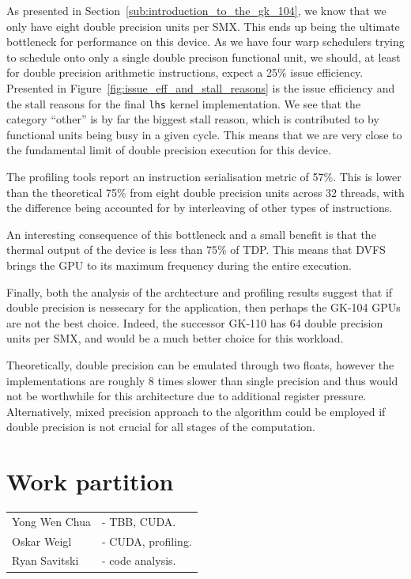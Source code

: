 \documentclass[11pt, oneside, a4paper]{article}
\begin{document}
As presented in Section~\ref{sub:introduction_to_the_gk_104}, we know that we only have eight double precision units per SMX. This ends up being the ultimate bottleneck for performance on this device.
As we have four warp schedulers trying to schedule onto only a single double precison functional unit, we should, at least for double precision arithmetic instructions, expect a 25\% issue efficiency.
Presented in Figure~\ref{fig:issue_eff_and_stall_reasons} is the issue efficiency and the stall reasons for the final \texttt{lhs} kernel implementation.
We see that the category ``other'' is by far the biggest stall reason, which is contributed to by functional units being busy in a given cycle.
This means that we are very close to the fundamental limit of double precision execution for this device.

The profiling tools report an instruction serialisation metric of 57\%. This is lower than the theoretical 75\% from eight double precision units across 32 threads, with the difference being accounted for by interleaving of other types of instructions.

An interesting consequence of this bottleneck and a small benefit is that the thermal output of the device is less than 75\% of TDP. This means that DVFS brings the GPU to its maximum frequency during the entire execution.

Finally, both the analysis of the archtecture and profiling results suggest that if double precision is nessecary for the application, then perhaps the GK-104 GPUs are not the best choice. Indeed, the successor GK-110 has 64 double precision units per SMX, and would be a much better choice for this workload.

Theoretically, double precision can be emulated through two floats, however the implementations are roughly 8 times slower than single precision and thus would not be worthwhile for this architecture due to additional register pressure. Alternatively, mixed precision approach to the algorithm could be employed if double precision is not crucial for all stages of the computation.




\section{Work partition} %
\label{sec:work_partition}
\begin{tabular}{ l l  }
Yong Wen Chua & - TBB, CUDA. \\
Oskar Weigl & - CUDA, profiling. \\
Ryan Savitski & - code analysis. \\
\end{tabular}
\end{document}
